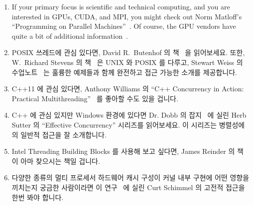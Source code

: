 \begin{enumerate}
\item	If your primary focus is scientific and technical computing,
	and you are interested in GPUs, CUDA, and MPI, you
	might check out Norm Matloff's ``Programming on
	Parallel Machines''~\cite{NormMatloff2013ParProcBook}.
	Of course, the GPU vendors have quite a bit of additional
	information~\cite{AMD2017OpenCL,NVidia2017GPGPU,NVidia2017GPGPU-university}.
\fi
\item	POSIX 쓰레드에 관심 있다면, David R.~Butenhof 의
	책~\cite{Butenhof1997pthreads} 을 읽어보세요.
	또한, W.~Richard Stevens 의 책~\cite{WRichardStevens1992} 은 UNIX 와
	POSIX 를 다루고, Stewart Weiss 의 수업노트~\cite{StewartWeiss2013UNIX}
	는 훌륭한 예제들과 함께 완전하고 접근 가능한 소개를 제공합니다.
\iffalse

\item	If you are interested in POSIX Threads, you might take
	a look at David R.~Butenhof's book~\cite{Butenhof1997pthreads}.
	In addition,
	W.~Richard Stevens's book~\cite{WRichardStevens1992}
	covers UNIX and POSIX, and Stewart Weiss's lecture
	notes~\cite{StewartWeiss2013UNIX} provide an
	thorough and accessible introduction with a good set of
	examples.
\fi
\item	C++11 에 관심 있다면, Anthony Williams 의 ``C++ Concurrency in Action:
	Practical Multithreading''~\cite{AnthonyWilliams2012} 를 좋아할 수도
	있을 겁니다.
\iffalse

\item	If you are interested in C++11, you might like
	Anthony Williams's ``C++ Concurrency in Action: Practical
	Multithreading''~\cite{AnthonyWilliams2012}.
\fi
\item	C++ 에 관심 있지만 Windows 환경에 있다면 Dr. Dobb 의
	잡지~\cite{HerbSutter2008EffectiveConcurrency} 에 실린 Herb Sutter 의
	``Effective Concurrency'' 시리즈를 읽어보세요.
	이 시리즈는 병렬성에의 일반적 접근을 잘 소개합니다.
\iffalse

\item	If you are interested in C++, but in a Windows environment,
	you might try Herb Sutter's ``Effective Concurrency''
	series in
	Dr. Dobbs Journal~\cite{HerbSutter2008EffectiveConcurrency}.
	This series does a reasonable job of presenting a
	commonsense approach to parallelism.
\fi
\item	Intel Threading Building Blocks 를 사용해 보고 싶다면, James Reinder 의
	책~\cite{Reinders2007Textbook} 이 아마 찾으시는 책일 겁니다.
\iffalse

\item	If you want to try out Intel Threading Building Blocks,
	then perhaps James Reinders's book~\cite{Reinders2007Textbook}
	is what you are looking for.
\fi
\item	다양한 종류의 멀티 프로세서 하드웨어 캐시 구성이 커널 내부 구현에 어떤
	영향을 끼치는지 궁금한 사람이라면 이
	연구~\cite{Schimmel:1994:USM:175689} 에 실린 Curt Schimmel 의 고전적
	접근을 한번 봐야 합니다.
\iffalse


\end{enumerate}
